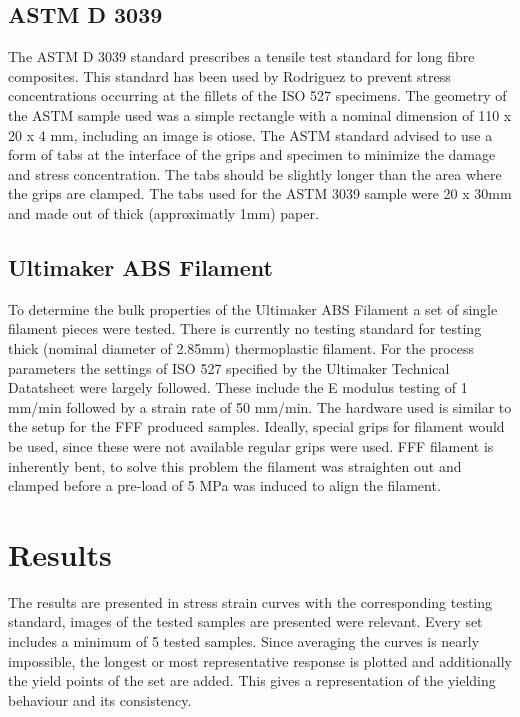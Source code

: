 \subsection{ASTM D 3039}
The ASTM D 3039 standard \cite{Afd2016NEN-EN-ISO527-2} prescribes a tensile test standard for long fibre composites. This standard has been used by Rodriguez \cite{Rodriguez2001MechanicalInvestigation} to prevent  stress concentrations occurring at the fillets of the ISO 527 specimens. The geometry of the ASTM sample used was a simple rectangle with a nominal dimension of 110 x 20 x 4 mm, including an image is otiose. The ASTM standard advised to use a form of tabs at the interface of the grips and specimen to minimize the damage and stress concentration. The tabs should be slightly longer than the area where the grips are clamped. The tabs used for the ASTM 3039 sample were 20 x 30mm and made out of thick (approximatly 1mm) paper.

\subsection{Ultimaker ABS Filament}
To determine the bulk properties of the Ultimaker ABS Filament a set of single filament pieces were tested. There is currently no testing standard for testing thick (nominal diameter of 2.85mm) thermoplastic filament. For the process parameters the settings of ISO 527 specified by the Ultimaker Technical Datatsheet \cite{Ultimaker2018TechnicalABS} were largely followed. These include the E modulus testing of 1 mm/min followed by a strain rate of 50 mm/min. The hardware used is similar to the setup for the FFF produced samples. Ideally, special grips for filament would be used, since these were not available regular grips were used. 
FFF filament is inherently bent, to solve this problem the filament was straighten out and clamped before a pre-load of 5 MPa was induced to align the filament. 

\section{Results}
The results are presented in stress strain curves with the corresponding testing standard, images of the tested samples are presented were relevant. Every set includes a minimum of 5 tested samples. Since averaging the curves is nearly impossible, the longest or most representative response is plotted and additionally the yield points of the set are added. This gives a representation of the yielding behaviour and its consistency. 

